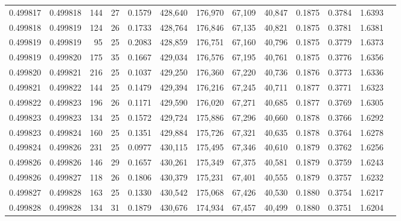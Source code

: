 \begin{tabular}{rrrrrrrrrrrrr}
0.499817 & 0.499818 & 144 &  27 &                                     0.1579 & 428,640 & 176,970 &  67,109 &  40,847 & 0.1875 & 0.3784 & 1.6393 \\
0.499818 & 0.499819 & 124 &  26 &                                     0.1733 & 428,764 & 176,846 &  67,135 &  40,821 & 0.1875 & 0.3781 & 1.6381 \\
0.499819 & 0.499819 &  95 &  25 &                                     0.2083 & 428,859 & 176,751 &  67,160 &  40,796 & 0.1875 & 0.3779 & 1.6373 \\
0.499819 & 0.499820 & 175 &  35 &                                     0.1667 & 429,034 & 176,576 &  67,195 &  40,761 & 0.1875 & 0.3776 & 1.6356 \\
0.499820 & 0.499821 & 216 &  25 &                                     0.1037 & 429,250 & 176,360 &  67,220 &  40,736 & 0.1876 & 0.3773 & 1.6336 \\
0.499821 & 0.499822 & 144 &  25 &                                     0.1479 & 429,394 & 176,216 &  67,245 &  40,711 & 0.1877 & 0.3771 & 1.6323 \\
0.499822 & 0.499823 & 196 &  26 &                                     0.1171 & 429,590 & 176,020 &  67,271 &  40,685 & 0.1877 & 0.3769 & 1.6305 \\
0.499823 & 0.499823 & 134 &  25 &                                     0.1572 & 429,724 & 175,886 &  67,296 &  40,660 & 0.1878 & 0.3766 & 1.6292 \\
0.499823 & 0.499824 & 160 &  25 &                                     0.1351 & 429,884 & 175,726 &  67,321 &  40,635 & 0.1878 & 0.3764 & 1.6278 \\
0.499824 & 0.499826 & 231 &  25 &                                     0.0977 & 430,115 & 175,495 &  67,346 &  40,610 & 0.1879 & 0.3762 & 1.6256 \\
0.499826 & 0.499826 & 146 &  29 &                                     0.1657 & 430,261 & 175,349 &  67,375 &  40,581 & 0.1879 & 0.3759 & 1.6243 \\
0.499826 & 0.499827 & 118 &  26 &                                     0.1806 & 430,379 & 175,231 &  67,401 &  40,555 & 0.1879 & 0.3757 & 1.6232 \\
0.499827 & 0.499828 & 163 &  25 &                                     0.1330 & 430,542 & 175,068 &  67,426 &  40,530 & 0.1880 & 0.3754 & 1.6217 \\
0.499828 & 0.499828 & 134 &  31 &                                     0.1879 & 430,676 & 174,934 &  67,457 &  40,499 & 0.1880 & 0.3751 & 1.6204 \\

\end{tabular}

